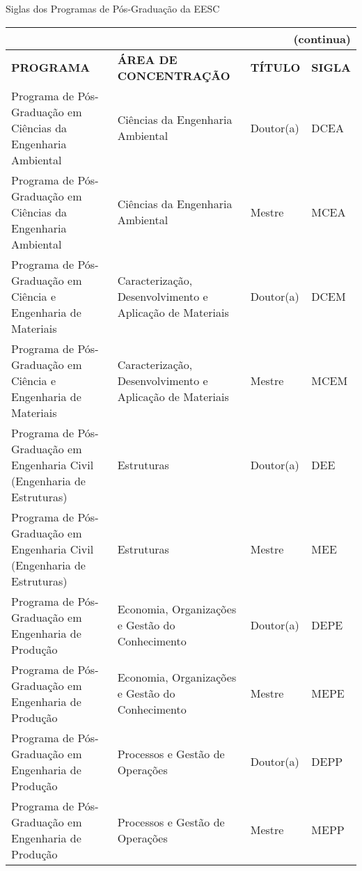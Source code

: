 \begin{apendicesenv}
\begin{quadro}[htb]
\ABNTEXfontereduzida
\caption[Siglas dos Programas de P\'os-Gradua\c{c}\~ao da EESC]{Siglas dos Programas de P\'os-Gradua\c{c}\~ao da EESC} 
\label{quadro-eesc}
\begin{tabular}{|p{6.0cm}|p{4.5cm}|p{2.0cm}|p{1.75cm}|}
\multicolumn{4}{r}{{(continua)}} \\ 
  \hline
   \textbf{PROGRAMA} & \textbf{\'AREA DE CONCENTRA\c{C}\~AO} & \textbf{T\'ITULO} & \textbf{SIGLA}  \\
    \hline
Programa de P\'os-Gradua\c{c}\~ao em Ci\^encias da Engenharia Ambiental & Ci\^encias da Engenharia Ambiental & Doutor(a) & DCEA \\
Programa de P\'os-Gradua\c{c}\~ao em Ci\^encias da Engenharia Ambiental & Ci\^encias da Engenharia Ambiental & Mestre & MCEA \\
Programa de P\'os-Gradua\c{c}\~ao em Ci\^encia e Engenharia de Materiais & Caracteriza\c{c}\~ao, Desenvolvimento e Aplica\c{c}\~ao de Materiais  & Doutor(a) & DCEM \\
Programa de P\'os-Gradua\c{c}\~ao em Ci\^encia e Engenharia de Materiais & Caracteriza\c{c}\~ao, Desenvolvimento e Aplica\c{c}\~ao de Materiais & Mestre & MCEM \\
Programa de P\'os-Gradua\c{c}\~ao em Engenharia Civil (Engenharia de Estruturas) & Estruturas & Doutor(a) & DEE \\
Programa de P\'os-Gradua\c{c}\~ao em Engenharia Civil (Engenharia de Estruturas) & Estruturas & Mestre & MEE \\
Programa de P\'os-Gradua\c{c}\~ao em Engenharia de Produ\c{c}\~ao & Economia, Organiza\c{c}\~oes e Gest\~ao do Conhecimento & Doutor(a) & DEPE \\
Programa de P\'os-Gradua\c{c}\~ao em Engenharia de Produ\c{c}\~ao & Economia, Organiza\c{c}\~oes e Gest\~ao do Conhecimento & Mestre & MEPE \\
Programa de P\'os-Gradua\c{c}\~ao em Engenharia de Produ\c{c}\~ao & Processos e Gest\~ao de Opera\c{c}\~oes & Doutor(a) & DEPP \\
Programa de P\'os-Gradua\c{c}\~ao em Engenharia de Produ\c{c}\~ao & Processos e Gest\~ao de Opera\c{c}\~oes & Mestre & MEPP \\

\end{tabular}
\end{quadro}
\end{apendicesenv}
